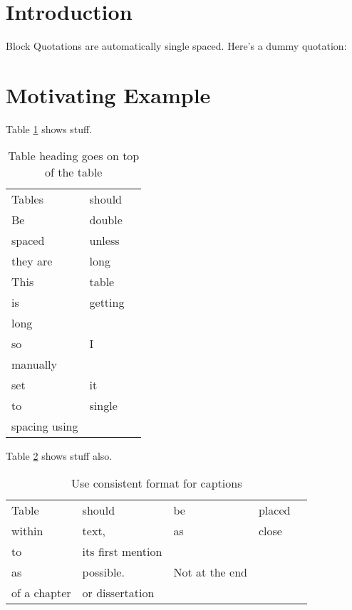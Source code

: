 \section{Introduction}
\label{section_intro}

Block Quotations are automatically single spaced. Here's a dummy quotation:
\begin{quotation}
  \blindtext
\end{quotation}

\section{Motivating Example}
Table \ref{tab:label} shows stuff. \blindtext
\begin{table}[tp]
  \centering
  \caption[Table heading]{Table heading goes on top of the table}
  \label{tab:label}
  \renewcommand{\arraystretch}{1.2} %
  \begin{tabular}{@{}lll@{}}
    Tables & should \\
    Be & double\\
    spaced & unless & \\
    they are & long\\
    This & table\\
    is & getting\\
    long\\
    so & I\\
    manually\\
    set &it \\
    to & single\\
    spacing using
  \end{tabular}
\end{table}
Table \ref{tab:label2} shows stuff also.
\begin{table}[tp]
  \centering
  \caption{Use consistent format for captions}
  \label{tab:label2}
  \renewcommand{\arraystretch}{2} %
  \begin{tabular}{@{}lllll@{}}
    Table & should & be & placed\\
    within & text, & as & close\\
    to & its first mention\\
    as & possible. & Not at the end\\
    of a chapter & or dissertation
  \end{tabular}
\end{table}

\blindtext[2]

